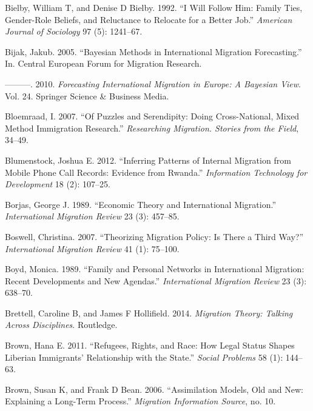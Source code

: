 \documentclass[
]{article}
\begin{document}
\leavevmode\hypertarget{ref-bielby1992will}{}%
Bielby, William T, and Denise D Bielby. 1992. ``I Will Follow Him:
Family Ties, Gender-Role Beliefs, and Reluctance to Relocate for a
Better Job.'' \emph{American Journal of Sociology} 97 (5): 1241--67.

\leavevmode\hypertarget{ref-bijak2005bayesian}{}%
Bijak, Jakub. 2005. ``Bayesian Methods in International Migration
Forecasting.'' In. Central European Forum for Migration Research.

\leavevmode\hypertarget{ref-bijak2010forecasting}{}%
---------. 2010. \emph{Forecasting International Migration in Europe: A
Bayesian View}. Vol. 24. Springer Science \& Business Media.

\leavevmode\hypertarget{ref-bloemraad2007puzzles}{}%
Bloemraad, I. 2007. ``Of Puzzles and Serendipity: Doing Cross-National,
Mixed Method Immigration Research.'' \emph{Researching Migration.
Stories from the Field}, 34--49.

\leavevmode\hypertarget{ref-blumenstock2012inferring}{}%
Blumenstock, Joshua E. 2012. ``Inferring Patterns of Internal Migration
from Mobile Phone Call Records: Evidence from Rwanda.''
\emph{Information Technology for Development} 18 (2): 107--25.

\leavevmode\hypertarget{ref-borjas1989economic}{}%
Borjas, George J. 1989. ``Economic Theory and International Migration.''
\emph{International Migration Review} 23 (3): 457--85.

\leavevmode\hypertarget{ref-boswell2007theorizing}{}%
Boswell, Christina. 2007. ``Theorizing Migration Policy: Is There a
Third Way?'' \emph{International Migration Review} 41 (1): 75--100.

\leavevmode\hypertarget{ref-boyd1989family}{}%
Boyd, Monica. 1989. ``Family and Personal Networks in International
Migration: Recent Developments and New Agendas.'' \emph{International
Migration Review} 23 (3): 638--70.

\leavevmode\hypertarget{ref-brettell2014migration}{}%
Brettell, Caroline B, and James F Hollifield. 2014. \emph{Migration
Theory: Talking Across Disciplines}. Routledge.

\leavevmode\hypertarget{ref-brown2011refugees}{}%
Brown, Hana E. 2011. ``Refugees, Rights, and Race: How Legal Status
Shapes Liberian Immigrants' Relationship with the State.'' \emph{Social
Problems} 58 (1): 144--63.

\leavevmode\hypertarget{ref-brown2006assimilation}{}%
Brown, Susan K, and Frank D Bean. 2006. ``Assimilation Models, Old and
New: Explaining a Long-Term Process.'' \emph{Migration Information
Source}, no. 10.
\end{document}
